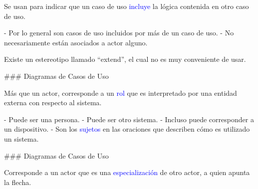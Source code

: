 
\centering{}

 Se usan para indicar que un caso de uso \textcolor{blue}{incluye}
la lógica contenida en otro caso de uso.

- Por lo general son casos de uso incluidos por más de un caso de uso.
- No necesariamente están asociados a actor alguno.

Existe un estereotipo llamado ``extend'', el cual no es muy conveniente de usar.

\columnsend

### Diagramas de Casos de Uso


\columnsbegin


\vspace{-5mm}
\centering{}

 Más que un actor, corresponde a un \textcolor{blue}{rol} que es interpretado por una entidad
externa con respecto al sistema.\newline
\columnsend

- Puede ser una persona.
- Puede ser otro sistema.
- Incluso puede corresponder a un dispositivo.
- Son los \textcolor{blue}{sujetos} en las oraciones que describen cómo es utilizado un sistema.


### Diagramas de Casos de Uso


\columnsbegin


\centering{}

 Corresponde a un actor que es una \textcolor{blue}{especialización} de
otro actor, a quien apunta la flecha.

